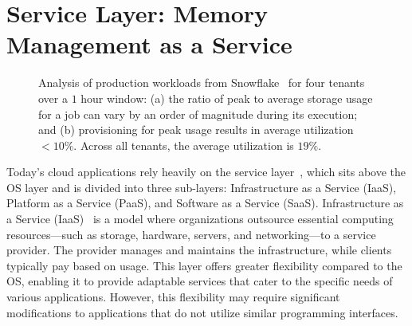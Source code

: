 \chapter{Service Layer: Memory Management as a Service}
\label{chap:service}

\begin{figure}[t]
  \centering
  \caption[Snowflake workload anaylsis.]{\small{Analysis of production workloads from Snowflake~\cite{snowset} for four tenants over a $1$ hour window: (a) the ratio of peak to average storage usage for a job can vary by an order of magnitude during its execution; and (b) provisioning for peak usage results in average utilization $<10\%$. Across all tenants, the average utilization is $19\%$.}}\label{fig:ephemerals}%
\end{figure}

Today's cloud applications rely heavily on the service layer~\cite{service1, service2, service3, service4, service5}, which sits above the OS layer and is divided into three sub-layers: Infrastructure as a Service (IaaS), Platform as a Service (PaaS), and Software as a Service (SaaS). Infrastructure as a Service (IaaS)~\cite{iaas1, iaas2} is a model where organizations outsource essential computing resources—such as storage, hardware, servers, and networking—to a service provider. The provider manages and maintains the infrastructure, while clients typically pay based on usage. This layer offers greater flexibility compared to the OS, enabling it to provide adaptable services that cater to the specific needs of various applications. However, this flexibility may require significant modifications to applications that do not utilize similar programming interfaces.

